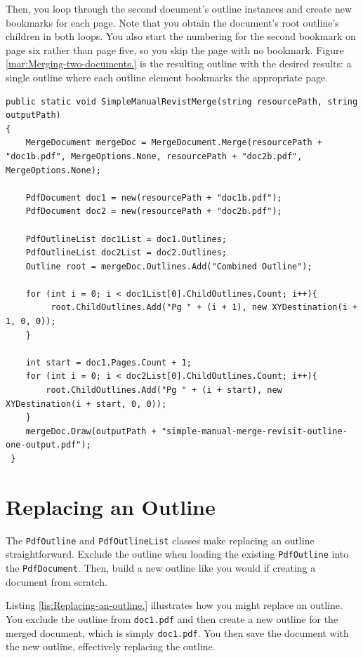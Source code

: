 \documentclass[american]{tufte-book}
\numberwithin{equation}{section}
\numberwithin{figure}{section}
\begin{document}
{{Then, you loop through the second document's outline instances and
create new bookmarks for each page. Note that you obtain the document's
root outline's children in both loops. You also start the numbering
for the second bookmark on page six rather than page five, so you
skip the page with no bookmark. Figure \ref{mar:Merging-two-documents.}
is the resulting outline with the desired results: a single outline
where each outline element bookmarks the appropriate page.
\bgroup{}
\begin{lstlisting}[caption={Merging two outlines.},label={lis:Merging-two-outlines.-1},basicstyle={\footnotesize\ttfamily},breaklines=true]
public static void SimpleManualRevistMerge(string resourcePath, string outputPath)
{
    MergeDocument mergeDoc = MergeDocument.Merge(resourcePath + "doc1b.pdf", MergeOptions.None, resourcePath + "doc2b.pdf", MergeOptions.None);

    PdfDocument doc1 = new(resourcePath + "doc1b.pdf");
    PdfDocument doc2 = new(resourcePath + "doc2b.pdf");

    PdfOutlineList doc1List = doc1.Outlines;
    PdfOutlineList doc2List = doc2.Outlines;
    Outline root = mergeDoc.Outlines.Add("Combined Outline");

    for (int i = 0; i < doc1List[0].ChildOutlines.Count; i++){
         root.ChildOutlines.Add("Pg " + (i + 1), new XYDestination(i + 1, 0, 0));
    }

    int start = doc1.Pages.Count + 1;
    for (int i = 0; i < doc2List[0].ChildOutlines.Count; i++){
        root.ChildOutlines.Add("Pg " + (i + start), new XYDestination(i + start, 0, 0));
    }
    mergeDoc.Draw(outputPath + "simple-manual-merge-revisit-outline-one-output.pdf");
 }
\end{lstlisting}
\leavevmode\egroup


\section{Replacing an Outline}

The \texttt{PdfOutline} and \texttt{PdfOutlineList} classes make replacing
an outline straightforward. Exclude the outline when loading the existing
\texttt{PdfOutline} into the \texttt{PdfDocument}. Then, build a new
outline like you would if creating a document from scratch.

Listing \ref{lis:Replacing-an-outline.} illustrates how you might
replace an outline. You exclude the outline from \texttt{doc1.pdf}
and then create a new outline for the merged document, which is simply
\texttt{doc1.pdf}. You then save the document with the new outline,
effectively replacing the outline.

}}
\end{document}
